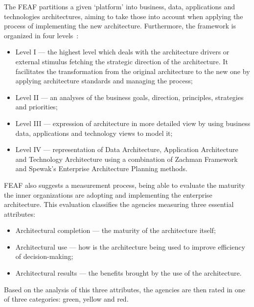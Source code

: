 The FEAF partitions a given `platform' into business, data, applications and technologies architectures, aiming to take those into account when applying the process of implementing the new architecture. Furthermore, the framework is organized in four levels~\citep{Tang2004}:
\begin{itemize}
\item Level I --- the highest level which deals with the architecture drivers or external stimulus fetching the strategic direction of the architecture. It facilitates the transformation from the original architecture to the new one by applying architecture standards and managing the process;
\item Level II --- an analyses of the business goals, direction, principles, strategies and priorities;
\item Level III --- expression of architecture in more detailed view by using business data, applications and technology views to model it;
\item Level IV --- representation of Data Architecture, Application Architecture and Technology Architecture using a combination of Zachman Framework and Spewak's Enterprise Architecture Planning methods.
\end{itemize}

FEAF also suggests a measurement process, being able to evaluate the maturity the inner organizations are adopting and implementing the enterprise architecture. This evaluation classifies the agencies measuring three essential attributes: 
\begin{itemize}
\item Architectural completion --- the maturity of the architecture itself;
\item Architectural use --- how is the architecture being used to improve efficiency of decision-making;
\item Architectural results --- the benefits brought by the use of the architecture.
\end{itemize}

Based on the analysis of this three attributes, the agencies are then rated in one of three categories: green, yellow and red. 


